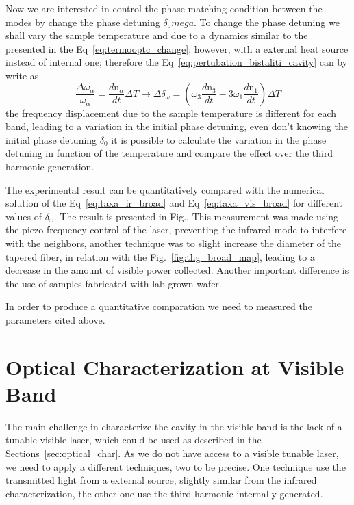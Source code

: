 Now we are interested in control the phase matching condition between the modes by change the phase detuning $\delta_omega$. To change the phase detuning we shall vary the sample temperature and due to a dynamics similar to the presented in the Eq~\ref{eq:termooptc_change}; however, with a external heat source instead of internal one; therefore the Eq~\ref{eq:pertubation_bistaliti_cavity} can by write as 
\begin{equation}
    \frac{\Delta\omega_\alpha}{\omega_\alpha} = \frac{d\text{n}_\alpha}{dt}\Delta T \rightarrow \Delta\delta_\omega = \left(\omega_3\frac{d\text{n}_3}{dt} - 3\omega_1\frac{d\text{n}_1}{dt}\right)\Delta T
    \label{eq:temperature_mode_variation}
\end{equation}
the frequency displacement due to the sample temperature is different for each band, leading to a variation in the initial phase detuning, even don't knowing the initial phase detuning $\delta_0$ it is possible to calculate the variation in the phase detuning in function of the temperature and compare the effect over the third harmonic generation. 

The experimental result can be quantitatively compared with the numerical solution of the Eq~\ref{eq:taxa_ir_broad} and Eq~\ref{eq:taxa_vis_broad} for different values of $\delta_\omega$. The result is presented in Fig.. This measurement was made using the piezo frequency control of the laser, preventing the infrared mode to interfere with the neighbors, another technique was to slight increase the diameter of the tapered fiber, in relation with the Fig.~\ref{fig:thg_broad_map}, leading to a decrease in the amount of visible power collected. Another important difference is the use of samples fabricated with lab grown wafer.

In order to produce a quantitative comparation we need to measured the parameters cited above.  

\section{Optical Characterization at Visible Band}

The main challenge in characterize the cavity in the visible band is the lack of a tunable visible laser, which could be used as described in the Sections~\ref{sec:optical_char}. As we do not have access to a visible tunable laser, we need to apply a different techniques, two to be precise. One technique use the transmitted light from a external source, slightly similar from the infrared characterization, the other one use the third harmonic internally generated. 

